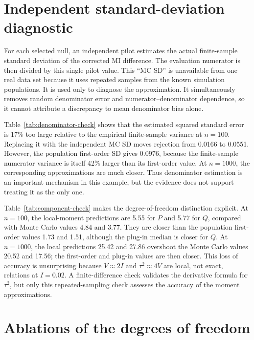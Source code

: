 \section{Independent standard-deviation diagnostic}

For each selected null, an independent pilot estimates the actual
finite-sample standard deviation of the corrected MI difference. The
evaluation numerator is then divided by this single pilot value. This
``MC SD'' is unavailable from one real data set because it uses repeated
samples from the known simulation populations. It is used only to diagnose
the approximation. It simultaneously removes random denominator error and
numerator--denominator dependence, so it cannot attribute a discrepancy to
mean denominator bias alone.



Table~\ref{tab:denominator-check} shows that the estimated squared standard
error is 17\% too large relative to the empirical finite-sample variance at
\(n=100\). Replacing it with the independent MC SD moves rejection from
0.0166 to 0.0551. However, the population first-order SD gives 0.0976,
because the finite-sample numerator variance is itself 42\% larger than its
first-order value. At \(n=1000\), the corresponding approximations are much
closer. Thus denominator estimation is an important mechanism in this
example, but the evidence does not support treating it as the only one.

Table~\ref{tab:component-check} makes the degree-of-freedom distinction
explicit. At \(n=100\), the local-moment predictions are 5.55 for \(P\) and
5.77 for \(Q\), compared with Monte Carlo values 4.84 and 3.77. They are
closer than the population first-order values 1.73 and 1.51, although the
plug-in median is closer for \(Q\). At \(n=1000\), the local predictions
25.42 and 27.86 overshoot the Monte Carlo values 20.52 and 17.56; the
first-order and plug-in values are then closer. This loss of accuracy is
unsurprising because \(V\approx2I\) and \(\tau^2\approx4V\) are local, not
exact, relations at \(I=0.02\). A finite-difference check validates the
derivative formula for \(\tau^2\), but only this repeated-sampling check
assesses the accuracy of the moment approximations.

\section{Ablations of the degrees of freedom}

